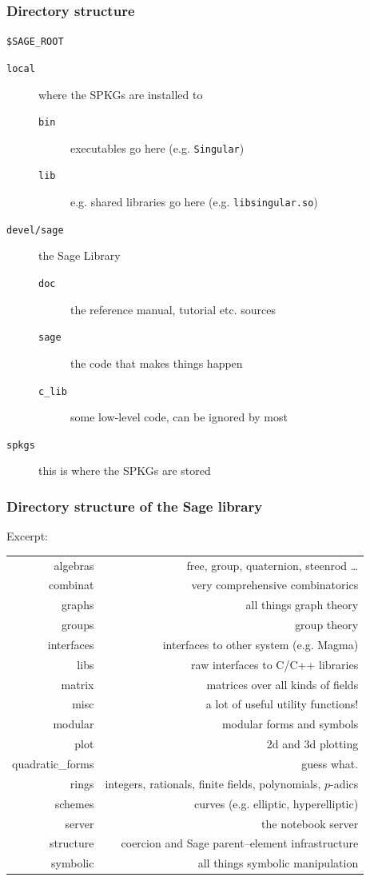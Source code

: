 \documentclass[11pt,blackandwhite]{beamer}
\begin{document}
\begin{frame}
\frametitle{Directory structure}
\texttt{\$SAGE\_ROOT}
\begin{description}
 \item[\texttt{local}] where the SPKGs are installed to
  \begin{description}
   \item[\texttt{bin}] executables go here (e.g. \texttt{Singular})
   \item[\texttt{lib}] e.g. shared libraries go here (e.g.
\texttt{libsingular.so})
  \end{description}
 \item[\texttt{devel/sage}] the Sage Library
 \begin{description}
 \item[\texttt{doc}] the reference manual, tutorial etc. sources
 \item[\texttt{sage}] the code that makes things happen
 \item[\texttt{c\_lib}] some low-level code, can be ignored by most
 \end{description}
 \item[\texttt{spkgs}] this is where the SPKGs are stored
\end{description}
\end{frame}

\begin{frame}
\frametitle{Directory structure of the Sage library}
Excerpt:
\begin{small}
\begin{tabular}{|r|r|}
\hline
algebras & free, group, quaternion, steenrod \dots \\
combinat & very comprehensive combinatorics\\
graphs & all things graph theory\\
groups & group theory\\
interfaces & interfaces to other system (e.g. Magma)\\
libs & raw interfaces to C/C++ libraries\\
matrix & matrices over all kinds of fields\\
misc & a lot of useful utility functions!\\
modular & modular forms and symbols\\
plot & 2d and 3d plotting\\
quadratic\_forms & guess what.\\
rings & integers, rationals, finite fields, polynomials, $p$-adics\\
schemes & curves (e.g. elliptic, hyperelliptic)\\
server & the notebook server\\
structure & coercion and Sage parent--element infrastructure\\
symbolic & all things symbolic manipulation\\
\hline
\end{tabular}
\end{small}
\end{frame}
\end{document}
